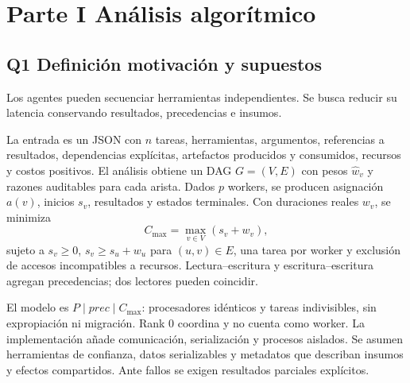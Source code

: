 \begin{abstract}
Se implementó un planificador de tareas MCP que construye un DAG
ponderado y distribuye trabajo con MPI por prioridad de camino restante.
La corrección del scheduler se distingue de la incertidumbre del grafo
inferido. Se comparan ejecución secuencial, FIFO y prioridad crítica.
En 54 ejecuciones controladas se conservaron los resultados; las 27
verificaciones de consultas alcanzaron exactitud, completitud y
consistencia de 1.00. La carga sensible a prioridades redujo el tiempo
\PrioritySaving{}\% frente al baseline secuencial. También se verificaron
MPI y MCP reales. La evaluación autenticada de Jev y el despliegue
multinodo siguen pendientes.
\end{abstract}

\section{Parte I Análisis algorítmico}
\subsection{Q1 Definición motivación y supuestos}
Los agentes pueden secuenciar herramientas independientes. Se busca
reducir su latencia conservando resultados, precedencias e insumos.

La entrada es un JSON con $n$ tareas, herramientas, argumentos,
referencias a resultados, dependencias explícitas, artefactos producidos
y consumidos, recursos y costos positivos. El análisis obtiene un DAG
$G=(V,E)$ con pesos $\hat w_v$ y razones auditables para cada arista.
Dados $p$ workers, se producen asignación $a(v)$, inicios $s_v$,
resultados y estados terminales. Con duraciones reales $w_v$, se minimiza
\begin{equation}
C_{\max}=\max_{v\in V}(s_v+w_v),
\end{equation}
sujeto a $s_v\geq0$, $s_v\geq s_u+w_u$ para $(u,v)\in E$, una tarea
por worker y exclusión de accesos incompatibles a recursos.
Lectura--escritura y escritura--escritura agregan precedencias;
dos lectores pueden coincidir.

El modelo es $P\mid prec\mid C_{\max}$: procesadores idénticos y tareas
indivisibles, sin expropiación ni migración. Rank 0 coordina y no cuenta
como worker. La implementación añade comunicación, serialización y
procesos aislados. Se asumen herramientas de confianza, datos
serializables y metadatos que describan insumos y efectos compartidos.
Ante fallos se exigen resultados parciales explícitos.

